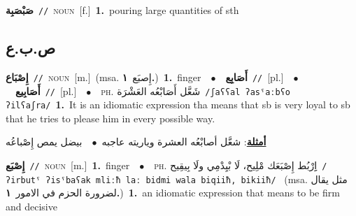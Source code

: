\documentclass[10pt,a4paper,twoside]{article} %
\begin{document}
\begin{multicols}{2}
{{{{{{\setlength\topsep{0pt}\textbf{\foreignlanguage{arabic}{صَبْصَبِة}}\ {\color{gray}\texttt{//}\color{black}}\ \textsc{noun}\ [f.]\ \textbf{1.}~pouring large quantities of sth\ 

\vspace{-3mm}
\subsection*{\color{blue}\foreignlanguage{arabic}{ص.ب.ع}\color{blue}{}} 

{\setlength\topsep{0pt}\textbf{\foreignlanguage{arabic}{إِصْبَاع}}\ {\color{gray}\texttt{//}\color{black}}\ \textsc{noun}\ [m.]\ \color{gray}(msa. \foreignlanguage{arabic}{إِصبَع}~\foreignlanguage{arabic}{\textbf{١.}})\color{black}\ \textbf{1.}~finger\ \ $\bullet$\ \ \setlength\topsep{0pt}\textbf{\foreignlanguage{arabic}{أَصَابِع}}\ {\color{gray}\texttt{//}\color{black}}\ [pl.]\ \ $\bullet$\ \ \setlength\topsep{0pt}\textbf{\foreignlanguage{arabic}{أَصَابِيع}}\ {\color{gray}\texttt{//}\color{black}}\ [pl.]\ \ $\bullet$\ \ \textsc{ph.} \color{gray} \foreignlanguage{arabic}{شَعَّل أَصَابْعُه العَشْرَة}\color{black}\ {\color{gray}\texttt{/{\sffamily ʃaʕʕal ʔasˤaːbʕo ʔilʕaʃra}/}\color{black}}\ \textbf{1.}~It is an idiomatic expression tha means that sb is very loyal to sb that he tries to please him in every possible way.\  \begin{flushright}\color{gray}\foreignlanguage{arabic}{\textbf{\underline{\foreignlanguage{arabic}{أمثلة}}}: شعَّل أصابْعُه العشرة وياريته عاجبه\ $\bullet$\ \  بيضل يمص إِصْباعُه}\end{flushright}\color{black}} \vspace{2mm}

{\setlength\topsep{0pt}\textbf{\foreignlanguage{arabic}{إِصْبَع}}\ {\color{gray}\texttt{//}\color{black}}\ \textsc{noun}\ [m.]\ \textbf{1.}~finger\ \ $\bullet$\ \ \textsc{ph.} \color{gray} \foreignlanguage{arabic}{اِِرْبُط إِصْبَعَك مْلِيح، لَا بْيِدْمِي ولَا بِيقِيح}\color{black}\ {\color{gray}\texttt{/{\sffamily ʔirbutˤ ʔisˤbaʕak mliːħ laː bidmi wala biqiiħ, bikiiħ}/}\color{black}}\ \color{gray} (msa. \foreignlanguage{arabic}{مثل يقال لضرورة الحزم في الامور}~\foreignlanguage{arabic}{\textbf{١.}})\color{black}\ \textbf{1.}~an idiomatic expression that means to be firm and decisive\ 

}}}}}}}
\end{multicols}
\end{document}
